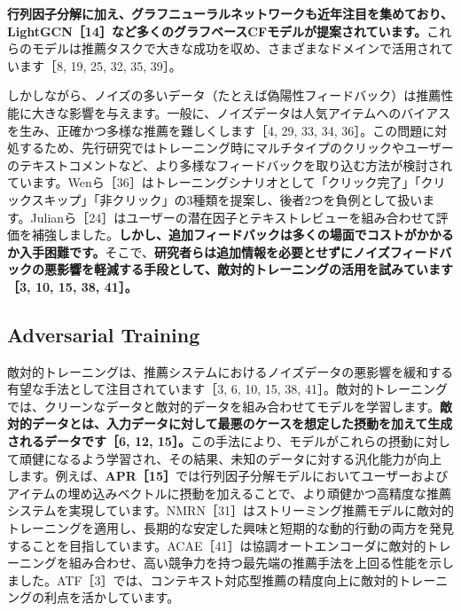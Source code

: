 \documentclass[11pt,a4paper]{article}
\begin{document}
\textbf{行列因子分解に加え、グラフニューラルネットワークも近年注目を集めており、LightGCN［14］など多くのグラフベースCFモデルが提案されています。}これらのモデルは推薦タスクで大きな成功を収め、さまざまなドメインで活用されています［8, 19, 25, 32, 35, 39］。

しかしながら、ノイズの多いデータ（たとえば偽陽性フィードバック）は推薦性能に大きな影響を与えます。一般に、ノイズデータは人気アイテムへのバイアスを生み、正確かつ多様な推薦を難しくします［4, 29, 33, 34, 36］。この問題に対処するため、先行研究ではトレーニング時にマルチタイプのクリックやユーザーのテキストコメントなど、より多様なフィードバックを取り込む方法が検討されています。Wenら［36］はトレーニングシナリオとして「クリック完了」「クリックスキップ」「非クリック」の3種類を提案し、後者2つを負例として扱います。Julianら［24］はユーザーの潜在因子とテキストレビューを組み合わせて評価を補強しました。\textbf{しかし、追加フィードバックは多くの場面でコストがかかるか入手困難です。}そこで、\textbf{研究者らは追加情報を必要とせずにノイズフィードバックの悪影響を軽減する手段として、敵対的トレーニングの活用を試みています［3, 10, 15, 38, 41］。}

\subsection{Adversarial Training}

敵対的トレーニングは、推薦システムにおけるノイズデータの悪影響を緩和する有望な手法として注目されています［3, 6, 10, 15, 38, 41］。敵対的トレーニングでは、クリーンなデータと敵対的データを組み合わせてモデルを学習します。\textbf{敵対的データとは、入力データに対して最悪のケースを想定した摂動を加えて生成されるデータです［6, 12, 15］。}この手法により、モデルがこれらの摂動に対して頑健になるよう学習され、その結果、未知のデータに対する汎化能力が向上します。例えば、\textbf{APR［15］}では行列因子分解モデルにおいてユーザーおよびアイテムの埋め込みベクトルに摂動を加えることで、より頑健かつ高精度な推薦システムを実現しています。NMRN［31］はストリーミング推薦モデルに敵対的トレーニングを適用し、長期的な安定した興味と短期的な動的行動の両方を発見することを目指しています。ACAE［41］は協調オートエンコーダに敵対的トレーニングを組み合わせ、高い競争力を持つ最先端の推薦手法を上回る性能を示しました。ATF［3］では、コンテキスト対応型推薦の精度向上に敵対的トレーニングの利点を活かしています。
\end{document}
